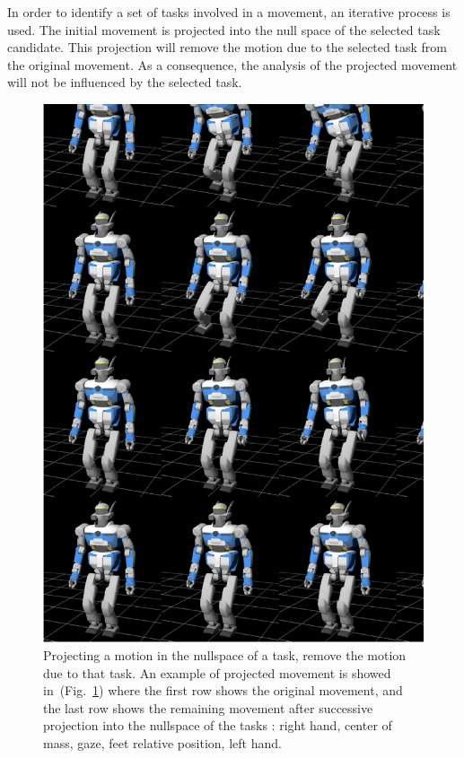 \documentclass[letterpaper, 10pt, conference]{ieeeconf}      %
\begin{document}
In order to identify a set of tasks involved in a movement, an iterative
process is used. The initial movement is projected into the null space of the
selected task candidate. This projection will remove the motion due to the
selected task from the original movement. As a consequence,
the analysis of the projected movement will not be influenced by
the selected task. 
\begin{figure}[t]
\begin{center}
\includegraphics[width=0.9\linewidth]{img/nullspaceProjection.ps}
\end{center}
\caption{Projecting a motion in the nullspace of a task, remove the motion
	due to that task. An example of projected movement is showed in~(Fig.~\ref{fig:nullspace})
where the first row shows the original movement, and the last row shows the
remaining movement after successive projection into the nullspace of the tasks
: right hand, center of mass, gaze, feet relative position, left hand. }
\label{fig:nullspace}
\end{figure}
\end{document}
